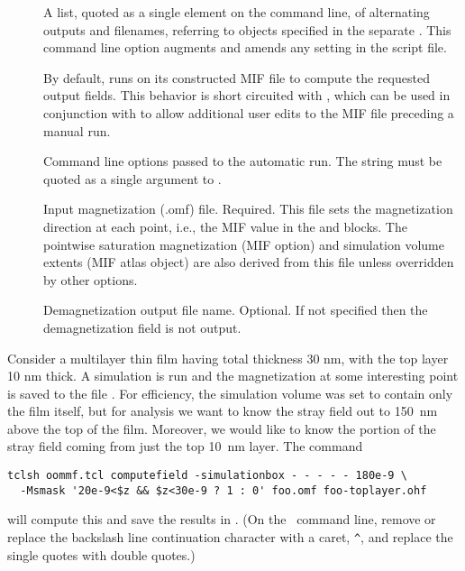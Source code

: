 \begin{description}
\item[]
  A list, quoted as a single element on the command line, of alternating
  outputs and filenames, referring to  objects specified
  in the separate . This command line option
  augments and amends any  setting in the script file.

\item[]
  By default,  runs
   on its
  constructed MIF file to compute the requested output fields. This
  behavior is short circuited with , which can be used in
  conjunction with  to allow additional user edits to the
  MIF file preceding a manual  run.

\item[]
  Command line options passed to the automatic  run. The
   string must be quoted as a single argument to
  .

\item[]
  Input magnetization (.omf) file. Required. This file sets the
  magnetization direction at each point, i.e., the MIF  value
  in the  and
    blocks.
  The pointwise saturation magnetization (MIF  option) and
  simulation volume extents (MIF atlas object) are also derived from
  this file unless overridden by other options.

\item[]
  Demagnetization output file name. Optional. If not specified then the
  demagnetization field is not output.

\end{description}

Consider a multilayer thin film having total thickness 30 nm, with the
top layer 10 nm thick. A simulation is run and the magnetization at some
interesting point is saved to the file . For efficiency, the
simulation volume was set to contain only the film itself, but for
analysis we want to know the stray field out to 150~nm above the top of
the film. Moreover, we would like to know the portion of the stray field
coming from just the top 10~nm layer. The command
\begin{verbatim}
tclsh oommf.tcl computefield -simulationbox - - - - - 180e-9 \
  -Msmask '20e-9<$z && $z<30e-9 ? 1 : 0' foo.omf foo-toplayer.ohf
\end{verbatim}
will compute this and save the results in . (On
the \Windows\ command line, remove or replace the backslash line
continuation character with a caret, \verb+^+, and replace the
single quotes with double quotes.)

